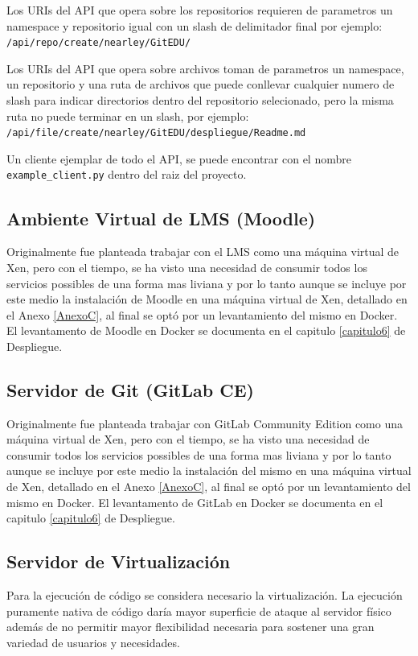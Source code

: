 Los URIs del API que opera sobre los repositorios requieren de parametros un namespace y repositorio igual con un slash de delimitador final por ejemplo: \\
\texttt{/api/repo/create/nearley/GitEDU/}

Los URIs del API que opera sobre archivos toman de parametros un namespace, un repositorio y una ruta de archivos que puede conllevar cualquier numero de slash para indicar directorios dentro del repositorio selecionado, pero la misma ruta no puede terminar en un slash, por ejemplo: \\
\texttt{/api/file/create/nearley/GitEDU/despliegue/Readme.md}

Un cliente ejemplar de todo el API, se puede encontrar con el nombre \\
\texttt{example\_client.py} dentro del raiz del proyecto.

 
\subsection{Ambiente Virtual de LMS  (Moodle)}
\label{instalacion-moodle}
Originalmente fue planteada trabajar con el LMS como una máquina virtual de Xen, pero con el tiempo, se ha visto una necesidad de consumir todos los servicios possibles de una forma mas liviana y por lo tanto aunque se incluye por este medio la instalación de Moodle en una máquina virtual de Xen, detallado en el Anexo \ref{AnexoC}, al final se optó por un levantamiento del mismo en Docker. El levantamento de Moodle en Docker se documenta en el capitulo \ref{capitulo6} de Despliegue.

 
\subsection{Servidor de Git (GitLab CE)}
Originalmente fue planteada trabajar con GitLab Community Edition como una máquina virtual de Xen, pero con el tiempo, se ha visto una necesidad de consumir todos los servicios possibles de una forma mas liviana y por lo tanto aunque se incluye por este medio la instalación del mismo en una máquina virtual de Xen, detallado en el Anexo \ref{AnexoC}, al final se optó por un levantamiento del mismo en Docker. El levantamento de GitLab en Docker se documenta en el capitulo \ref{capitulo6} de Despliegue.

\subsection{Servidor de Virtualización}
Para la ejecución de código se considera necesario la virtualización. La ejecución puramente nativa de código daría mayor superficie de ataque al servidor físico además de no permitir mayor flexibilidad necesaria para sostener una gran variedad de usuarios y necesidades.

